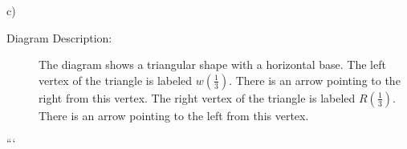 c)

\begin{description}
    \item[Diagram Description:] The diagram shows a triangular shape with a horizontal base. The left vertex of the triangle is labeled \( w \left( \frac{1}{3} \right) \). There is an arrow pointing to the right from this vertex. The right vertex of the triangle is labeled \( R \left( \frac{1}{3} \right) \). There is an arrow pointing to the left from this vertex.
\end{description}

```